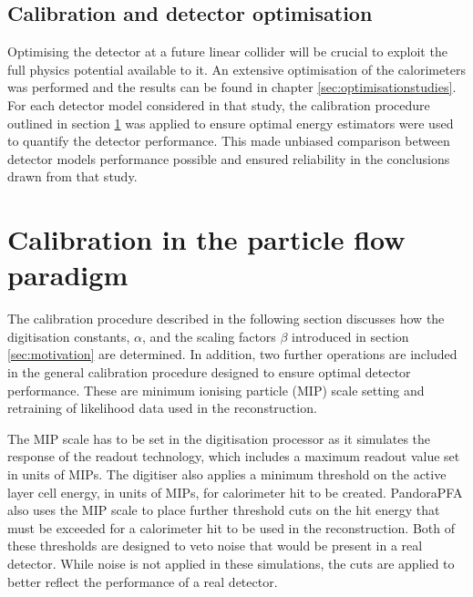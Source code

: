 
\subsection{Calibration and detector optimisation}
Optimising the detector at a future linear collider will be crucial to exploit the full physics potential available to it.  An extensive optimisation of the calorimeters was performed and the results can be found in chapter \ref{sec:optimisationstudies}.  For each detector model considered in that study, the calibration procedure outlined in section \ref{sec:overviewcalibration} was applied to ensure optimal energy estimators were used to quantify the detector performance.  This made unbiased comparison between detector models performance possible and ensured reliability in the conclusions drawn from that study.


\section{Calibration in the particle flow paradigm}
\label{sec:overviewcalibration}
The calibration procedure described in the following section discusses how the digitisation constants, $\alpha$, and the scaling factors $\beta$ introduced in section \ref{sec:motivation} are determined.  In addition, two further operations are included in the general calibration procedure designed to ensure optimal detector performance.  These are minimum ionising particle (MIP) scale setting and retraining of likelihood data used in the reconstruction.  

The MIP scale has to be set in the digitisation processor as it simulates the response of the readout technology, which includes a maximum readout value set in units of MIPs.  The digitiser also applies a minimum threshold on the active layer cell energy, in units of MIPs, for calorimeter hit to be created.  PandoraPFA also uses the MIP scale to place further threshold cuts on the hit energy that must be exceeded for a calorimeter hit to be used in the reconstruction.  Both of these thresholds are designed to veto noise that would be present in a real detector.  While noise is not applied in these simulations, the cuts are applied to better reflect the performance of a real detector. 

